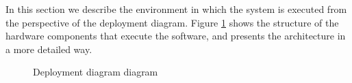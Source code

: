 
In this section we describe the environment in which the system is executed from the perspective of the deployment diagram. Figure \ref{fig:deployment_diagram} shows the structure of the hardware components that execute the software, and presents the architecture in a more detailed way.


\begin{figure}[H]
    \caption{\label{fig:deployment_diagram}Deployment diagram diagram}
\end{figure}

